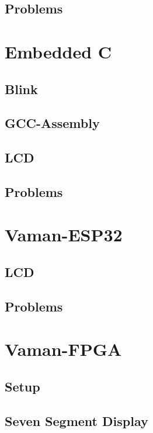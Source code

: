 \documentclass[11pt]{book}
\begin{document}
\section{Problems}

\chapter{Embedded C}
\section{Blink}



\section{GCC-Assembly}

\section{LCD}

\section{Problems}

%
\chapter{Vaman-ESP32}


\section{LCD}

\section{Problems}

\chapter{Vaman-FPGA}
\section{Setup}

\section{Seven Segment Display}

\end{document}
